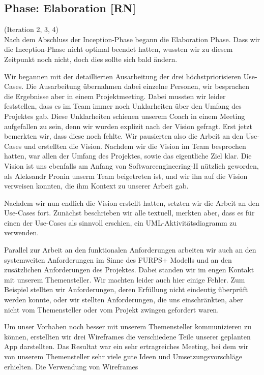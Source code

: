 \documentclass[10pt]{article}
\begin{document}
\subsection{Phase: Elaboration [RN]}
(Iteration 2, 3, 4)\\
Nach dem Abschluss der Inception-Phase begann die Elaboration Phase. Dass wir die Inception-Phase nicht optimal
beendet hatten, wussten wir zu diesem Zeitpunkt noch nicht, doch dies sollte sich bald ändern.\par
\medskip
Wir begannen mit der detaillierten Ausarbeitung der drei höchstpriorisieren Use-Cases. Die Ausarbeitung übernahmen
dabei einzelne Personen, wir besprachen die Ergebnisse aber in einem Projektmeeting. Dabei mussten wir leider feststellen,
dass es im Team immer noch Unklarheiten über den Umfang des Projektes gab. Diese Unklarheiten schienen unserem Coach
in einem Meeting aufgefallen zu sein, denn wir wurden explizit nach der Vision gefragt. Erst jetzt bemerkten wir,
dass diese noch fehlte. Wir pausierten also die Arbeit an den Use-Cases und erstellten die Vision. Nachdem wir die
Vision im Team besprochen hatten, war allen der Umfang des Projektes, sowie das eigentliche Ziel klar. Die Vision
ist uns ebenfalls am Anfang von Softwareengineering-II nützlich geworden, als Aleksandr Pronin unserm Team
beigetreten ist, und wir ihn auf die Vision verweisen konnten, die ihm Kontext zu unserer Arbeit gab.\par
\medskip
Nachdem wir nun endlich die Vision erstellt hatten, setzten wir die Arbeit an den Use-Cases fort.
Zunächst beschrieben wir alle textuell, merkten aber, dass es für einen der Use-Cases als sinnvoll erschien, ein UML-Aktivitätsdiagramm
zu verwenden.\par
\medskip
Parallel zur Arbeit an den funktionalen Anforderungen arbeiten wir auch an den
systemweiten Anforderungen im Sinne des FURPS+ Modells und an den zusätzlichen Anforderungen des Projektes.
Dabei standen wir im engen Kontakt mit unserem Themensteller. Wir machten leider auch hier einige Fehler.
Zum Beispiel stellten wir Anforderungen, deren Erfüllung nicht eindeutig überprüft werden konnte, oder wir
stellten Anforderungen, die uns einschränkten, aber nicht vom Themensteller oder vom Projekt zwingen gefordert waren.\par
\medskip
Um unser Vorhaben noch besser mit unserem Themensteller kommunizieren zu können, erstellten wir drei Wireframes
die verschiedene Teile unserer geplanten App darstellten. Das Resultat war ein sehr ertragreiches Meeting, bei dem
wir von unserem Themensteller sehr viele gute Ideen und Umsetzungsvorschläge erhielten. Die Verwendung von Wireframes
\end{document}
